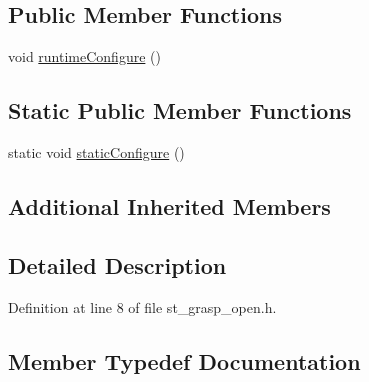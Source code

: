 \subsection*{Public Member Functions}
\begin{DoxyCompactItemize}
\item 
void \hyperlink{structsm__panda__moveit_1_1pick__states_1_1StGraspOpen_a1b53e0d7cd590d9da83164133bf17caf}{runtime\+Configure} ()
\end{DoxyCompactItemize}
\subsection*{Static Public Member Functions}
\begin{DoxyCompactItemize}
\item 
static void \hyperlink{structsm__panda__moveit_1_1pick__states_1_1StGraspOpen_a8cec2ad20840c68f599671143e0ffbdc}{static\+Configure} ()
\end{DoxyCompactItemize}
\subsection*{Additional Inherited Members}


\subsection{Detailed Description}


Definition at line 8 of file st\+\_\+grasp\+\_\+open.\+h.



\subsection{Member Typedef Documentation}
\mbox{\label{structsm__panda__moveit_1_1pick__states_1_1StGraspOpen_a02a356537b3f5259fe38bbeed6c6682b}} 
